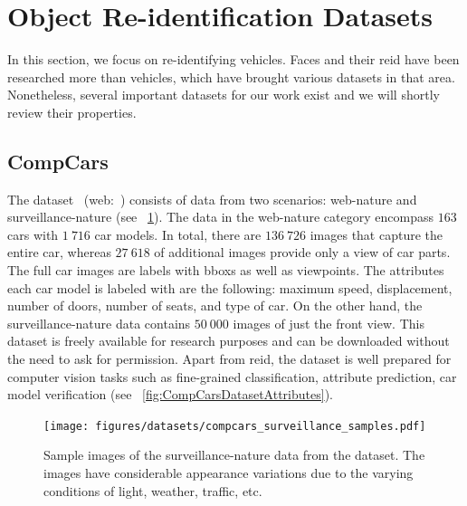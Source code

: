\section{Object Re-identification Datasets}
\label{sec:ObjectReIDDatasets}

In this section, we focus on re-identifying vehicles. Faces and their \gls{reid} have been researched more than vehicles, which have brought various datasets in that area. Nonetheless, several important datasets for our work exist and we will shortly review their properties.

\subsection{CompCars}
\label{ssec:DatasetCompCars}

The  dataset~\cite{yang2015compcars} (web:~\cite{webcompcarsdataset}) consists of data from two scenarios: web-nature and surveillance-nature (see \figtext{}~\ref{fig:CompCarsDatasetSurveillance}). The data in the web-nature category encompass $163$ cars with $1\ 716$ car models. In total, there are $136\ 726$ images that capture the entire car, whereas $27\ 618$ of additional images provide only a view of car parts. The full car images are labels with \glspl{bbox} as well as viewpoints. The attributes each car model is labeled with are the following: maximum speed, displacement, number of doors, number of seats, and type of car. On the other hand, the surveillance-nature data contains $50\ 000$ images of just the front view. This dataset is freely available for research purposes and can be downloaded without the need to ask for permission. Apart from \gls{reid}, the dataset is well prepared for computer vision tasks such as fine-grained classification, attribute prediction, car model verification (see \figtext{}~\ref{fig:CompCarsDatasetAttributes}).

\begin{figure}[t]
    \centerline{\texttt{[image: figures/datasets/compcars\_surveillance\_samples.pdf]}}
    \caption[ dataset]{Sample images of the surveillance-nature data from the  dataset. The images have considerable appearance variations due to the varying conditions of light, weather, traffic, etc. }
    \label{fig:CompCarsDatasetSurveillance}
\end{figure}


